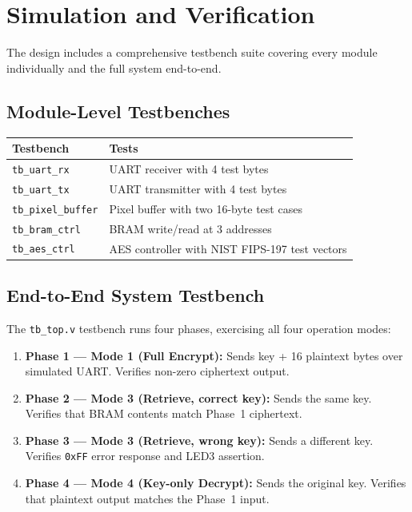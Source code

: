 \documentclass[12pt,a4paper]{article}
\begin{document}
\section{Simulation and Verification}

The design includes a comprehensive testbench suite covering every module individually and the full system end-to-end.

\subsection{Module-Level Testbenches}

\begin{center}\small
\begin{tabular}{ll}\toprule
\textbf{Testbench} & \textbf{Tests} \\ \midrule
\texttt{tb\_uart\_rx}       & UART receiver with 4 test bytes \\
\texttt{tb\_uart\_tx}       & UART transmitter with 4 test bytes \\
\texttt{tb\_pixel\_buffer}  & Pixel buffer with two 16-byte test cases \\
\texttt{tb\_bram\_ctrl}     & BRAM write/read at 3 addresses \\
\texttt{tb\_aes\_ctrl}      & AES controller with NIST FIPS-197 test vectors \\
\bottomrule
\end{tabular}
\end{center}

\subsection{End-to-End System Testbench}

The \texttt{tb\_top.v} testbench runs four phases, exercising all four operation modes:

\begin{enumerate}
    \item \textbf{Phase 1 --- Mode 1 (Full Encrypt):} Sends key + 16 plaintext bytes over simulated UART. Verifies non-zero ciphertext output.
    
    \item \textbf{Phase 2 --- Mode 3 (Retrieve, correct key):} Sends the same key. Verifies that BRAM contents match Phase~1 ciphertext.
    
    \item \textbf{Phase 3 --- Mode 3 (Retrieve, wrong key):} Sends a different key. Verifies \texttt{0xFF} error response and LED3 assertion.
    
    \item \textbf{Phase 4 --- Mode 4 (Key-only Decrypt):} Sends the original key. Verifies that plaintext output matches the Phase~1 input.
\end{enumerate}
\end{document}
